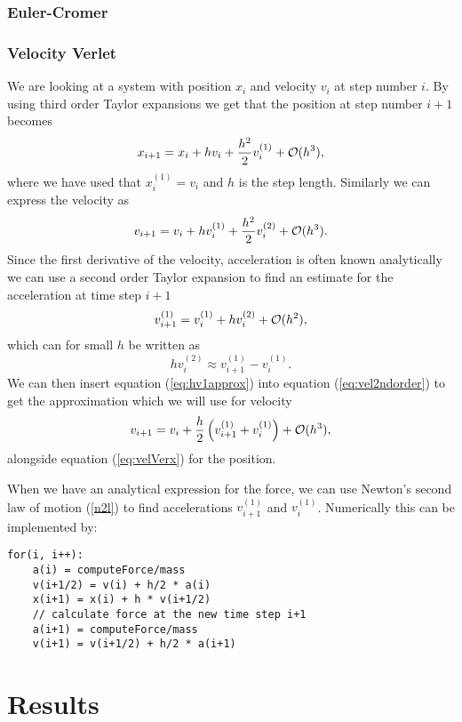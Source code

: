 \documentclass[norsk,a4paper,12pt]{article}
\begin{document}
{\subsubsection{Euler-Cromer}
\subsubsection{Velocity Verlet}
We are looking at a system with position $x_i$ and velocity $v_i$ at step number $i$. By using third order Taylor expansions we get that the position at step number $i+1$ becomes \begin{equation}
x_{i+1} = x_i + h v_i + \frac{h^2}{2}v_i^{(1)} + {\cal O}(h^3),
\label{eq:velVerx}
\end{equation}
where we have used that $x_i^{(1)} = v_i$ and $h$ is the step length. Similarly we can express the velocity as
\begin{equation}
v_{i+1} = v_i + h v_i^{(1)} + \frac{h^2}{2}v_i^{(2)} + {\cal O}(h^3).
\label{eq:vel2ndorder}
\end{equation}
Since the first derivative of the velocity, acceleration is often known analytically we can use a second order Taylor expansion to find an estimate for the acceleration at time step $i+1$
$$v_{i+1}^{(1)} = v_i^{(1)} + hv_i^{(2)} + {\cal O}(h^2), $$
which can for small $h$ be written as 
\begin{equation}
hv_i^{(2)} \approx v_{i+1}^{(1)}- v_i^{(1)}.
\label{eq:hv1approx}
\end{equation}
We can then insert equation (\ref{eq:hv1approx}) into equation (\ref{eq:vel2ndorder}) to get the approximation which we will use for velocity
\begin{equation}
v_{i+1} = v_i + \frac{h}{2}\left(v_{i+1}^{(1)} + v_i^{(1)}\right) + {\cal O}(h^3),
\label{eq:velVerv}
\end{equation}
alongside equation (\ref{eq:velVerx}) for the position. 

When we have an analytical expression for the force, we can use Newton's second law of motion (\ref{n2l}) to find accelerations $v_{i+1}^{(1)}$ and $v_{i}^{(1)}$. Numerically this can be implemented by:
\begin{lstlisting}
for(i, i++):
	a(i) = computeForce/mass
	v(i+1/2) = v(i) + h/2 * a(i)
	x(i+1) = x(i) + h * v(i+1/2)
	// calculate force at the new time step i+1
	a(i+1) = computeForce/mass
	v(i+1) = v(i+1/2) + h/2 * a(i+1)
\end{lstlisting}
\section{Results}
}
\end{document}
